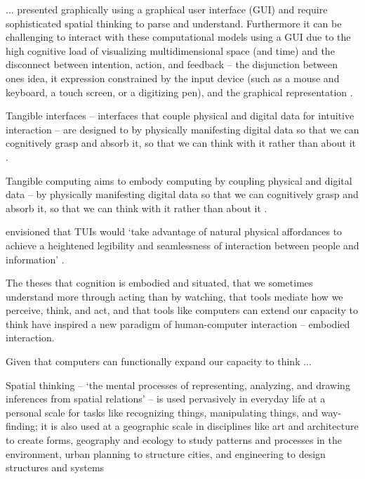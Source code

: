 ... presented graphically using a graphical user interface (GUI) and require sophisticated spatial thinking to parse and understand. 
Furthermore it can be challenging to interact with these computational models using a GUI 
due to the high cognitive load of visualizing multidimensional space (and time) %
and the disconnect between intention, action, and feedback -- 
the disjunction between ones idea, it expression constrained by the input device (such as a mouse and keyboard, a touch screen, or a digitizing pen), and the graphical representation \cite{Dourish2001,Ishii2008}. 










Tangible interfaces -- interfaces that couple physical and digital data for intuitive interaction \citep{Dourish2001} -- 
are designed to by physically manifesting digital data so that we can cognitively grasp and absorb it,
so that we can think with it rather than about it \citep{Kirsh2013}. 


Tangible computing aims to embody computing 
by coupling physical and digital data \citep{Dourish2001} -- 
by physically manifesting digital data so that we can cognitively grasp and absorb it,
so that we can think with it rather than about it \citep{Kirsh2013}. 

\citeauthor{Ishii1997} envisioned that TUIs would  `take advantage of natural physical affordances to achieve a heightened legibility and seamlessness of interaction between people and information' \citeyearpar{Ishii1997}. 



The theses
that cognition is embodied and situated,
that we sometimes understand more through acting than by watching,
that tools mediate how we perceive, think, and act, 
and that tools like computers can extend our capacity to think \citep{Kirsh2013}
have inspired a new paradigm of human-computer interaction -- embodied interaction.  



Given that computers can functionally expand our capacity to think \citep{Kirsh2013}
...




Spatial thinking -- `the mental processes of representing, analyzing, and drawing inferences from spatial relations' \cite{Uttal2013} -- 
is used pervasively in everyday life at a personal scale for tasks like recognizing things, manipulating things, and way-finding; 
it is also used at a geographic scale in disciplines like 
art and architecture to create forms, 
geography and ecology to study patterns and processes in the environment, 
urban planning to structure cities,
and 
engineering to design structures and systems








